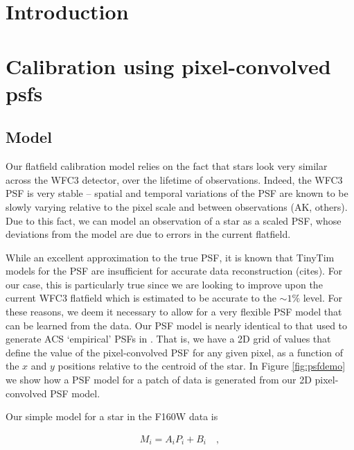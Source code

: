 \documentclass[12pt,preprint,pdftex]{aastex}
\begin{document}
\sloppy\sloppypar


\section{Introduction}



\section{Calibration using pixel-convolved psfs}

\subsection{Model}

Our flatfield calibration model relies on the fact that stars look very similar across the 
WFC3 detector, over the lifetime of observations.  Indeed, the WFC3 PSF is very stable --
spatial and temporal variations of the PSF are known to be slowly varying relative to 
the pixel scale and between observations (AK, others).  Due to this fact, we can model 
an observation of a star as a scaled PSF, whose deviations from the model are due to 
errors in the current flatfield.

While an excellent approximation to the true PSF, it is known that TinyTim models for the 
PSF are insufficient for accurate data reconstruction (cites).  For our case, this is particularly 
true since we are looking to improve upon the current WFC3 flatfield which is estimated to 
be accurate to the $\sim1\%$ level.   For these reasons, we deem it necessary to 
allow for a very flexible PSF model that can be learned from the data.  Our PSF model is 
nearly identical to that used to generate ACS `empirical' PSFs in \citet{AK}.  That is, we 
have a 2D grid of values that define the value of the pixel-convolved PSF for any given 
pixel, as a function of the $x$ and $y$ positions relative to the centroid of the star.  In Figure 
\ref{fig:psfdemo} we show how a PSF model for a patch of data is generated from our 2D 
pixel-convolved PSF model.

Our simple model for a star in the F160W data is 

\begin{eqnarray}
M_i = A_i P_i + B_i
\quad , 
\label{eqn:model-noflat}
\end{eqnarray}
\end{document}
